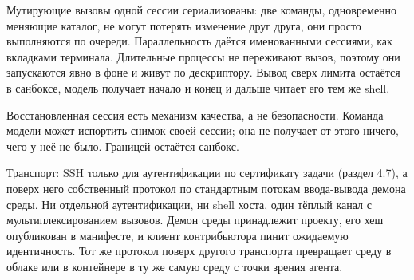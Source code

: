 Мутирующие вызовы одной сессии сериализованы: две команды, одновременно меняющие каталог, не могут потерять изменение друг друга, они просто выполняются по очереди. Параллельность даётся именованными сессиями, как вкладками терминала. Длительные процессы не переживают вызов, поэтому они запускаются явно в фоне и живут по дескриптору. Вывод сверх лимита остаётся в санбоксе, модель получает начало и конец и дальше читает его тем же shell.

\begin{warnbox}
Восстановленная сессия есть механизм качества, а не безопасности. Команда модели может испортить снимок своей сессии; она не получает от этого ничего, чего у неё не было. Границей остаётся санбокс.
\end{warnbox}

Транспорт: SSH только для аутентификации по сертификату задачи (раздел 4.7), а поверх него собственный протокол по стандартным потокам ввода-вывода демона среды. Ни отдельной аутентификации, ни shell хоста, один тёплый канал с мультиплексированием вызовов. Демон среды принадлежит проекту, его хеш опубликован в манифесте, и клиент контрибьютора пинит ожидаемую идентичность. Тот же протокол поверх другого транспорта превращает среду в облаке или в контейнере в ту же самую среду с точки зрения агента.
